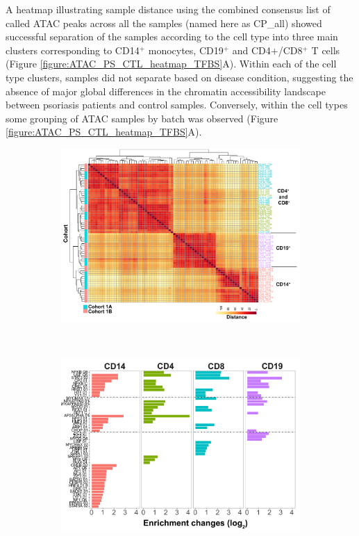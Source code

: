 A heatmap illustrating sample distance using the combined consensus list of called ATAC peaks across all the samples (named here as CP\_all) showed successful separation of the samples according to the cell type into three main clusters corresponding to CD14$^+$ monocytes, CD19$^+$ and CD4$+$/CD8$^+$ T cells (Figure \ref{figure:ATAC_PS_CTL_heatmap_TFBS}A). Within each of the cell type clusters, samples did not separate based on disease condition, suggesting the absence of major global differences in the chromatin accessibility landscape between psoriasis patients and control samples. Conversely, within the cell types some grouping of ATAC samples by batch was observed (Figure \ref{figure:ATAC_PS_CTL_heatmap_TFBS}A).

\bigskip
\begin{figure}[H]
\centering
\begin{subfigure}[b]{0.7\textwidth}
\centering 
\includegraphics[width=\textwidth]{./Results2/pdfs/ATAC_all_cell_types_heatmap_with_batch_annotation}
\caption{}
\end{subfigure}
~
\begin{subfigure}[b]{0.7\textwidth} 
\centering
\includegraphics[width=\textwidth]{./Results2/pdfs/ATAC_PS_CTL_cell_type_specific_master_list_conserved_TFBS_enrichment}

\end{subfigure}
\end{figure}
